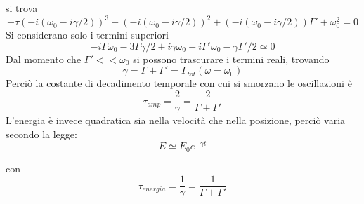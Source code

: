 \documentclass[twoside]{article}
\begin{document}
si trova
\begin{equation}
    -\tau(-i(\omega_0-i\gamma/2))^3+(-i(\omega_0-i\gamma/2))^2+(-i(\omega_0-i\gamma/2))\Gamma'+\omega_0^2=0
\end{equation}
Si considerano solo i termini superiori
\begin{equation}
    -i\Gamma\omega_0-3\Gamma \gamma/2 + i\gamma \omega_0 - i\Gamma' \omega_0 - \gamma \Gamma'/2 \simeq 0
\end{equation}
Dal momento che $\Gamma ' << \omega_0$ si possono trascurare i termini reali, trovando
\begin{equation}
    \gamma=\Gamma+\Gamma'=\Gamma_{tot}(\omega=\omega_0)
\end{equation}
Perciò la costante di decadimento temporale con cui si smorzano le oscillazioni è 
\begin{equation}
    \tau_{amp}=\frac{2}{\gamma}=\frac{2}{\Gamma+\Gamma'}
\end{equation}
L'energia è invece quadratica sia nella velocità che nella posizione, perciò varia secondo la legge:
\begin{equation}
    E\simeq E_0 e^{-\gamma t}
\end{equation}

con
\begin{equation}
    \tau_{energia}=\frac{1}{\gamma}=\frac{1}{\Gamma + \Gamma'}
\end{equation}
\end{document}
